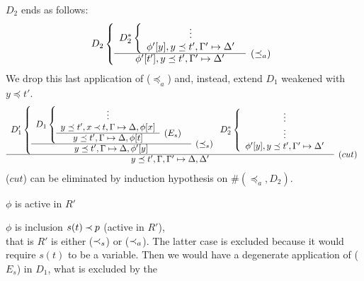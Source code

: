 \begin{PROOF}
\begin{LS}
\begin{LSA}
\begin{LSB}
$D_2$ ends as follows:
\[ D_2 \left \{ \begin{array}{cl}
 D_2^* \left \{ \begin{array}{cl}
 \vdots \\
 \phi'[y], y\preceq t', \Gamma'\Seq\Delta' \end{array} \right . \\ \cline{1-1}
 \phi'[t'], y\preceq t', \Gamma'\Seq\Delta' & \rabove{(\preceq_a)}
 \end{array} \right . \]
We drop this last application of ($\preceq_a$) and, instead, extend $D_1$
weakened with $y\preceq t'$. %
%
{ \scriptsize 
\[\begin{array}{cl}
D_1' \left \{ \begin{array}{cl}
D_1 \left \{ \begin{array}{cl}
  \vdots \\ 
  y\preceq t', x\Incl t,\Gamma\Seq\Delta, \phi[x]  \\ \cline{1-1}
y\preceq t', \Gamma\Seq\Delta, \phi[t]  & \raisebox{1.2ex}[1.5ex][0ex]{($E_s$)}
 \end{array} \right . \\ \cline{1-1}
y\preceq t', \Gamma\Seq\Delta, \phi'[y] &
\raisebox{1.2ex}[1.5ex][0ex]{($\preceq_s$)}
 \end{array} \right .
%
 D_2^*\left\{ \begin{array}{cl}
 \vdots \\
\vdots \\
\phi'[y], y\preceq t', \Gamma'\Seq\Delta' \end{array} \right .
 \\ \cline{1-1}
y\preceq t', \Gamma,\Gamma' \Seq \Delta,\Delta' &   \raisebox{1.2ex}[1.5ex][0ex]{($cut$)}
\end{array} \] }
($cut$) can be eliminated by induction hypothesis on $\#(\preceq_a,D_2)$.
%
%
\end{LSB}
%
%
%
\item\label{it:cutactive} %
 $\phi$ is active in $R'$
\begin{LSB}
\item\label{it:inact} $\phi$ is inclusion $s(t)\mathbin{\prec} p$ (active in $R'$),
\\
that is $R'$ is either ($\mathbin{\prec}_s$)
or ($\mathbin{\prec}_a$).
The latter case is excluded because it would require $s(t)$ to be a variable.
Then we would have a degenerate application of ($E_s$) in $D_1$, what is excluded by the

\end{LSB}
\end{LSA}
\end{LS}
\end{PROOF}
